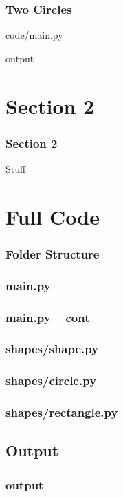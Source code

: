 \documentclass{beamer}
\begin{document}
\begin{frame}
\frametitle{Two Circles}

code/main.py


output

\end{frame}

\section{Section 2}
\begin{frame}
\frametitle{Section 2}
Stuff
\end{frame}

\appendix
\section{Full Code}
\begin{frame}
\frametitle{Folder Structure}
\end{frame}

\begin{frame}
\frametitle{main.py}

\end{frame}

\begin{frame}
\frametitle{main.py -- cont}

\end{frame}

\begin{frame}
\frametitle{shapes/shape.py}

\end{frame}

\begin{frame}
\frametitle{shapes/circle.py}

\end{frame}

\begin{frame}
\frametitle{shapes/rectangle.py}

\end{frame}

\subsection{Output}
\begin{frame}
\frametitle{output}

\end{frame}
\end{document}
